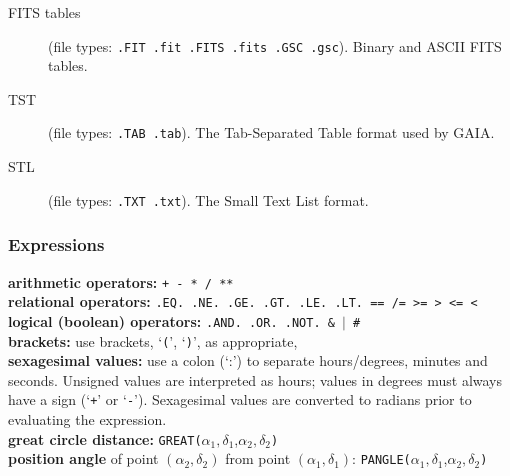 \documentclass[twoside,11pt]{article}
\renewcommand{\_}{\texttt{\symbol{95}}}
\begin{document}
\begin{description}

  \item[FITS tables] (file types: {\tt .FIT .fit .FITS .fits .GSC .gsc}).
   Binary and ASCII FITS tables.

  \item[TST] (file types: {\tt .TAB .tab}).
   The Tab-Separated Table format used by GAIA.

  \item[STL] (file types: {\tt .TXT .txt}).
   The Small Text List format.




\end{description}

\subsubsection*{Expressions}

{\bf arithmetic operators:} {\tt + - * / **}  \\
{\bf relational operators:}  {\tt .EQ. .NE. .GE. .GT. .LE.
   .LT. == /= >= > <= <}  \\
{\bf logical (boolean) operators:} {\tt .AND. .OR. .NOT. \& $|$ \# }  \\
{\bf brackets:} use brackets, `{\tt (}', `{\tt )}', as appropriate,  \\
{\bf sexagesimal values:} use a colon (`:') to separate
   hours/degrees, minutes and seconds. Unsigned values are interpreted
   as hours; values in degrees must always have a sign (`{\tt +}' or
   `{\tt -}'). Sexagesimal values are converted to radians prior to
   evaluating the expression.  \\
{\bf great circle distance:}
   {\tt GREAT(}$\alpha_{1},\delta_{1}$,$\alpha_{2},\delta_{2}${\tt )} \\
{\bf  position angle} of point $(\alpha_{2},\delta_{2})$ from point
  $(\alpha_{1},\delta_{1})$:
  {\tt PANGLE(}$\alpha_{1},\delta_{1}$,$\alpha_{2},\delta_{2}${\tt )}
\newpage
\end{document}
